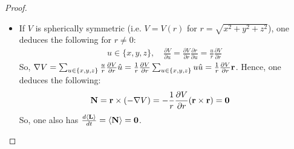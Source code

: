 \documentclass{article}
\begin{document}
\begin{proof}
\begin{itemize}
        \hfil

        \item[(b)] If $V$ is spherically symmetric (i.e. $V=V(r)$ for $r=\sqrt{x^2+y^2+z^2}$), one deduces the following for $r\neq 0$:
        \begin{align}
            u\in\{x,y,z\},\quad \frac{\partial V}{\partial u} = \frac{\partial V}{\partial r}\frac{\partial r}{\partial u} = \frac{u}{r}\frac{\partial V}{\partial r}
        \end{align}
        So, $\nabla V = \sum_{u\in\{x,y,z\}}\frac{u}{r}\frac{\partial V}{\partial r}\hat{u} = \frac{1}{r}\frac{\partial V}{\partial r}\sum_{u\in\{x,y,z\}}u\hat{u} =\frac{1}{r}\frac{\partial V}{\partial r}\mathbf{r}$. Hence, one deduces the following:
        \begin{align}
            \mathbf{N} &= \mathbf{r}\times (-\nabla V) = -\frac{1}{r}\frac{\partial V}{\partial r}(\mathbf{r} \times \mathbf{r})=\mathbf{0}
        \end{align}
        So, one also has $\frac{d\left<\mathbf{L}\right>}{dt}=\left<\mathbf{N}\right> = \mathbf{0}$.
    \end{itemize}
\end{proof}
\end{document}

